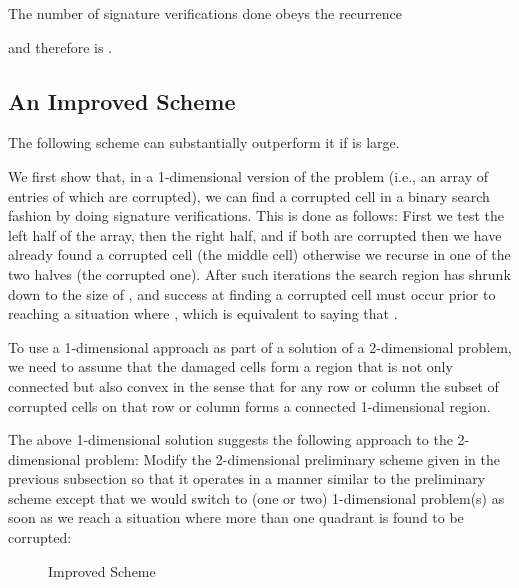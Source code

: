 \documentclass{llncs}
\begin{document}
The number  of signature verifications done
obeys the recurrence





\noindent and therefore  is .

\subsection{An Improved Scheme}
\label{ImprovedScheme}

The following scheme can substantially outperform
it if  is large.

We first show that, in a 1-dimensional version of
the problem (i.e., an array of  entries of which
 are corrupted), we can find a corrupted cell
in a binary search fashion by doing
 signature verifications.
This is done as follows:  First we test the left half of
the array, then the right half, and if both are
corrupted then we have already
found a corrupted cell (the middle cell) otherwise
we recurse in one of the two halves (the
corrupted one).   After  such 
iterations the search region has shrunk down 
to the size of , and success at finding
a corrupted cell must occur prior to 
reaching a situation where ,
which is equivalent to saying that 
.   

To use a 1-dimensional approach as part of
a solution of a 2-dimensional problem, we need
to assume that the  damaged cells form a region 
that is not only connected but also convex
in the sense that for any row or column the 
subset of corrupted cells on that row or 
column forms a connected 1-dimensional region.

The above 1-dimensional solution suggests the 
following approach to the 2-dimensional problem:
Modify the 2-dimensional preliminary scheme
given in the previous subsection 
so that it operates in a manner
similar to the preliminary scheme except that 
we would switch to (one or two) 1-dimensional problem(s)
as soon as we reach a situation where more than 
one quadrant is found to be corrupted: 

\begin{figure*}
\centerline{\subfigure[``'' Boundary]{\texttt{[image: 1234]}
\label{fig_improve_a}}
\hfil
\subfigure[``T'' Boundary]{\texttt{[image: 123]}
\label{fig_improve_b}}
\hfil
\subfigure[``I'' Boundary]{\texttt{[image: 34]}
\label{fig_improve_c}}}
\caption{Improved Scheme}
\label{fig_quadtree}
\end{figure*}
\end{document}
